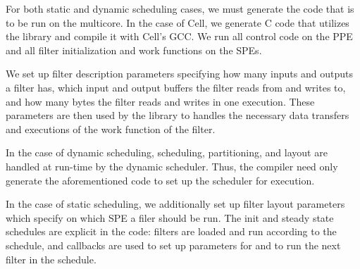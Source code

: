 For both static and dynamic scheduling cases, we must generate the code that
is to be run on the multicore. In the case of Cell, we generate C
code that utilizes the library and compile it with Cell's GCC. We run all
control code on the PPE and all filter initialization and work functions on the SPEs. 

We set up filter description parameters
specifying how many inputs and outputs a filter has, which input and output
buffers the filter reads from and writes to, and how many bytes the filter 
reads and writes in one execution. These parameters are then used by the
library to handles the necessary data transfers and executions of the
work function of the filter. 

In the case of dynamic scheduling, scheduling, partitioning, and layout
are handled at run-time by the dynamic scheduler. Thus, the compiler need only
generate the aforementioned code to set up the scheduler for execution.

In the case of static scheduling, we additionally set up filter layout parameters
which specify on which SPE a filer should be run. The init and steady state
schedules are explicit in the code: filters are loaded and run according to the
schedule, and callbacks are used to set up parameters for and to run the next filter in
the schedule.
